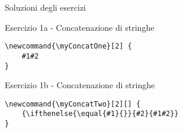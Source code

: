 \begin{frame}[fragile]{Soluzioni degli esercizi}

\begin{block}{Esercizio 1a - Concatenazione di stringhe}

\begin{lstlisting}
\newcommand{\myConcatOne}[2] {
	#1#2
}
\end{lstlisting}

\end{block}

\begin{block}{Esercizio 1b - Concatenazione di stringhe}

\begin{lstlisting}
\newcommand{\myConcatTwo}[2][] {
	{\ifthenelse{\equal{#1}{}}{#2}{#1#2}}
}
\end{lstlisting}

\end{block}

\end{frame}
